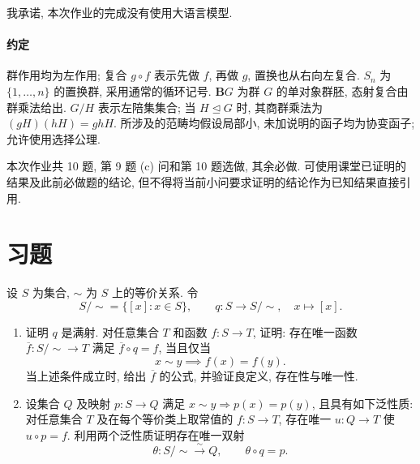\documentclass{article}
\begin{document}
{\heiti 我承诺, 本次作业的完成没有使用大语言模型.}

\paragraph{约定} 群作用均为左作用; 复合 $g\circ f$ 表示先做 $f$, 再做 $g$, 置换也从右向左复合. $S_n$ 为 $\{1,\ldots,n\}$ 的置换群, 采用通常的循环记号. $\mathbf{B}G$ 为群 $G$ 的单对象群胚, 态射复合由群乘法给出. $G/H$ 表示左陪集集合; 当 $H\unlhd G$ 时, 其商群乘法为 $(gH)(hH)=ghH$. 所涉及的范畴均假设局部小, 未加说明的函子均为协变函子; 允许使用选择公理.

本次作业共 10 题, 第 9 题 (c) 问和第 10 题选做, 其余必做. 可使用课堂已证明的结果及此前必做题的结论, 但不得将当前小问要求证明的结论作为已知结果直接引用.

\section*{习题}


\begin{problem}
设 $S$ 为集合, $\sim$ 为 $S$ 上的等价关系. 令
\[
  S/{\sim}=\{[x]:x\in S\},\qquad q:S\longrightarrow S/{\sim},\quad x\longmapsto[x].
\]
\begin{enumerate}
  \item[(a)] 证明 $q$ 是满射. 对任意集合 $T$ 和函数 $f:S\to T$, 证明: 存在唯一函数 $\overline f:S/{\sim}\to T$ 满足 $\overline f\circ q=f$, 当且仅当
  \[
    x\sim y\implies f(x)=f(y).
  \]
  当上述条件成立时, 给出 $\overline f$ 的公式, 并验证良定义, 存在性与唯一性.
  \item[(b)] 设集合 $Q$ 及映射 $p:S\to Q$ 满足 $x\sim y\Rightarrow p(x)=p(y)$, 且具有如下泛性质: 对任意集合 $T$ 及在每个等价类上取常值的 $f:S\to T$, 存在唯一 $u:Q\to T$ 使 $u\circ p=f$. 利用两个泛性质证明存在唯一双射
  \[
    \theta:S/{\sim}\xrightarrow{\sim}Q,\qquad \theta\circ q=p.
  \]
\end{enumerate}
\end{problem}
\end{document}
